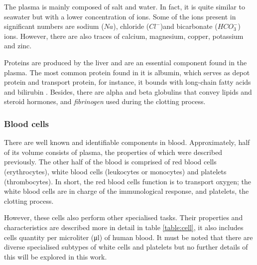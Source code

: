 The plasma is mainly composed of salt and water. In fact, it is quite similar to seawater but with a lower concentration of ions. Some of the ions present in significant numbers are sodium ($Na$), chloride ($Cl^-$)and bicarbonate ($HCO_3^-$) ions. However, there are also traces of calcium, magnesium, copper, potassium and zinc.

Proteins are produced by the liver and are an essential component found in the plasma. The most common protein found in it is albumin, which serves as depot protein and transport protein, for instance, it bounds with long-chain fatty acids and bilirubin \cite{kragh1981molecular}. Besides, there are alpha and beta globulins that convey lipids and steroid hormones, and \textit{fibrinogen} used during the clotting process.

\subsubsection{Blood cells}
There are well known and identifiable components in blood. Approximately, half of its volume consists of plasma, the properties of which were described previously. The other half of the blood is comprised of red blood cells (erythrocytes), white blood cells (leukocytes or monocytes) and platelets (thrombocytes). In short, the red blood cells function is to transport oxygen; the white blood cells are in charge of the immunological response, and platelets, the clotting process.

However, these cells also perform other specialised tasks. Their properties and characteristics are described more in detail in table \ref{table:cell}, it also includes cells quantity per microliter (\si{\micro\litre}) of human blood. It must be noted that there are diverse specialised subtypes of white cells and platelets but no further details of this will be explored in this work.

